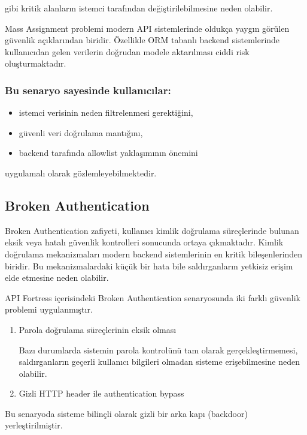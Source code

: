 gibi kritik alanların istemci tarafından değiştirilebilmesine neden olabilir.

Mass Assignment problemi modern API sistemlerinde oldukça yaygın görülen güvenlik açıklarından biridir. Özellikle ORM tabanlı backend sistemlerinde kullanıcıdan gelen verilerin doğrudan modele aktarılması ciddi risk oluşturmaktadır.

\subsubsection{Bu senaryo sayesinde kullanıcılar:}

\begin{itemize}[leftmargin=*]
    \item istemci verisinin neden filtrelenmesi gerektiğini,
    \item güvenli veri doğrulama mantığını,
    \item backend tarafında allowlist yaklaşımının önemini
\end{itemize}

uygulamalı olarak gözlemleyebilmektedir.

\subsection{Broken Authentication}
\label{broken-authentication}

Broken Authentication zafiyeti, kullanıcı kimlik doğrulama süreçlerinde bulunan eksik veya hatalı güvenlik kontrolleri sonucunda ortaya çıkmaktadır. Kimlik doğrulama mekanizmaları modern backend sistemlerinin en kritik bileşenlerinden biridir. Bu mekanizmalardaki küçük bir hata bile saldırganların yetkisiz erişim elde etmesine neden olabilir.

API Fortress içerisindeki Broken Authentication senaryosunda iki farklı güvenlik problemi uygulanmıştır.

\begin{enumerate}[leftmargin=*]
    \item Parola doğrulama süreçlerinin eksik olması

    Bazı durumlarda sistemin parola kontrolünü tam olarak gerçekleştirmemesi, saldırganların geçerli kullanıcı bilgileri olmadan sisteme erişebilmesine neden olabilir.

    \item Gizli HTTP header ile authentication bypass
\end{enumerate}

Bu senaryoda sisteme bilinçli olarak gizli bir arka kapı (backdoor) yerleştirilmiştir.

